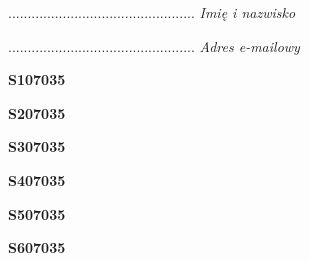 \begin{turn}{90}\begin{minipage}{\linewidth} \vspace{20mm} ................................................  \textit{Imię i nazwisko}\end{minipage}\end{turn}

\begin{turn}{90}\begin{minipage}{\linewidth} \vspace{20mm} ................................................  \textit{Adres e-mailowy}\end{minipage}\end{turn}

\begin{turn}{90}\huge \begin{minipage}{\linewidth} \vspace{10mm}\textbf{S107035}\end{minipage}\end{turn}

\begin{turn}{90}\huge \begin{minipage}{\linewidth} \vspace{10mm}\textbf{S207035}\end{minipage}\end{turn}

\begin{turn}{90}\huge \begin{minipage}{\linewidth} \vspace{10mm}\textbf{S307035}\end{minipage}\end{turn}

\begin{turn}{90}\huge \begin{minipage}{\linewidth} \vspace{10mm}\textbf{S407035}\end{minipage}\end{turn}

\begin{turn}{90}\huge \begin{minipage}{\linewidth} \vspace{10mm}\textbf{S507035}\end{minipage}\end{turn}

\begin{turn}{90}\huge \begin{minipage}{\linewidth} \vspace{10mm}\textbf{S607035}\end{minipage}\end{turn}

